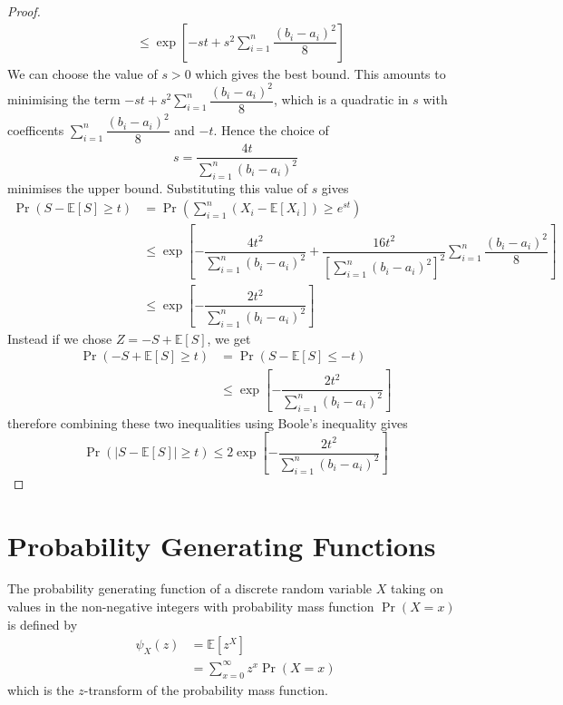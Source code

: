 \documentclass[11pt]{report} %
\begin{document}
\begin{proof}
\begin{align}
&\leq \exp\left[-st + s^{2}\sum_{i = 1}^{n}\dfrac{\left(b_{i} - a_{i}\right)^{2}}{8}\right]
\end{align}
We can choose the value of $s > 0$ which gives the best bound. This amounts to minimising the term $-st + s^{2}\sum_{i = 1}^{n}\dfrac{\left(b_{i} - a_{i}\right)^{2}}{8}$, which is a quadratic in $s$ with coefficents $\sum_{i = 1}^{n}\dfrac{\left(b_{i} - a_{i}\right)^{2}}{8}$ and $-t$. Hence the choice of
\begin{equation}
s = \dfrac{4t}{\sum_{i = 1}^{n}\left(b_{i} - a_{i}\right)^{2}}
\end{equation}
minimises the upper bound. Substituting this value of $s$ gives
\begin{align}
\operatorname{Pr}\left(S - \mathbb{E}\left[S\right] \geq t\right)  &= \operatorname{Pr}\left(\sum_{i = 1}^{n}\left(X_{i} - \mathbb{E}\left[X_{i}\right]\right) \geq e^{st}\right) \\
&\leq \exp\left[-\dfrac{4t^{2}}{\sum_{i = 1}^{n}\left(b_{i} - a_{i}\right)^{2}} + \dfrac{16t^{2}}{\left[\sum_{i = 1}^{n}\left(b_{i} - a_{i}\right)^{2}\right]^{2}}\sum_{i = 1}^{n}\dfrac{\left(b_{i} - a_{i}\right)^{2}}{8}\right] \\
&\leq \exp\left[-\dfrac{2t^{2}}{\sum_{i = 1}^{n}\left(b_{i} - a_{i}\right)^{2}} \right]
\end{align}
Instead if we chose $Z = -S + \mathbb{E}\left[S\right]$, we get
\begin{align}
\operatorname{Pr}\left(-S + \mathbb{E}\left[S\right] \geq t\right) &= \operatorname{Pr}\left(S - \mathbb{E}\left[S\right] \leq -t\right) \\
&\leq \exp\left[-\dfrac{2t^{2}}{\sum_{i = 1}^{n}\left(b_{i} - a_{i}\right)^{2}} \right]
\end{align}
therefore combining these two inequalities using Boole's inequality gives
\begin{equation}
\operatorname{Pr}\left(\left|S - \mathbb{E}\left[S\right]\right| \geq t\right) \leq 2\exp\left[-\dfrac{2t^{2}}{\sum_{i = 1}^{n}\left(b_{i} - a_{i}\right)^{2}} \right]
\end{equation}
\end{proof}

\section{Probability Generating Functions}

The probability generating function of a discrete random variable $X$ taking on values in the non-negative integers with probability mass function $\operatorname{Pr}\left(X = x\right)$ is defined by
\begin{align}
\psi_{X}\left(z\right) &= \mathbb{E}\left[z^{X}\right] \\
&= \sum_{x = 0}^{\infty}z^{x}\operatorname{Pr}\left(X = x\right)
\end{align}
which is the $z$-transform of the probability mass function.
\end{document}
